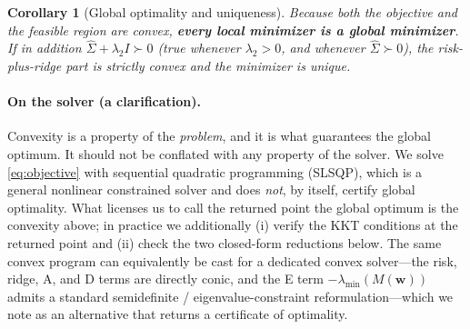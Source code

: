 \documentclass[11pt]{article}
\newcommand{\Sighat}{\hat\Sigma}
\newcommand{\w}{\mathbf{w}}
\newcommand{\M}{M(\w)}
\newcommand{\lammin}{\lambda_{\min}}
\newtheorem{corollary}{Corollary}
\begin{document}
\begin{corollary}[Global optimality and uniqueness]
Because both the objective and the feasible region are convex, \textbf{every local
minimizer is a global minimizer}. If in addition $\Sighat+\lambda_2 I\succ0$
(true whenever $\lambda_2>0$, and whenever $\Sighat\succ0$), the risk-plus-ridge
part is strictly convex and the minimizer is unique.
\end{corollary}

\paragraph{On the solver (a clarification).} Convexity is a property of the
\emph{problem}, and it is what guarantees the global optimum. It should not be
conflated with any property of the solver. We solve \eqref{eq:objective} with
sequential quadratic programming (SLSQP), which is a general nonlinear
constrained solver and does \emph{not}, by itself, certify global optimality.
What licenses us to call the returned point the global optimum is the convexity
above; in practice we additionally (i) verify the KKT conditions at the returned
point and (ii) check the two closed-form reductions below. The same convex
program can equivalently be cast for a dedicated convex solver---the risk, ridge,
A, and D terms are directly conic, and the E term $-\lammin(\M)$ admits a standard
semidefinite / eigenvalue-constraint reformulation---which we note as an
alternative that returns a certificate of optimality.

\vspace{0.3cm}
\end{document}

